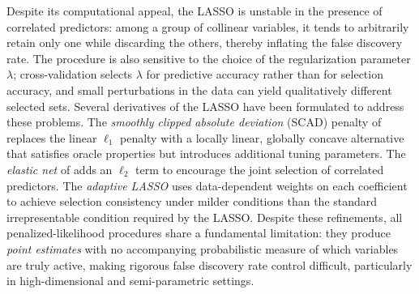 Despite its computational appeal, the LASSO is unstable in the
presence of correlated predictors: among a group of collinear
variables, it tends to arbitrarily retain only one while discarding
the others, thereby inflating the false discovery rate. The
procedure is also sensitive to the choice of the regularization
parameter $\lambda$; cross-validation selects $\lambda$ for
predictive accuracy rather than for selection accuracy, and small
perturbations in the data can yield qualitatively different selected
sets. Several derivatives of the LASSO have been formulated
to address these problems.  The \emph{smoothly clipped absolute deviation} (SCAD) penalty
of \citet{fan_variable_2001} replaces the linear $\ell_1$ penalty
with a locally linear, globally concave alternative that satisfies
oracle properties but introduces additional tuning parameters. The
\emph{elastic net} of \citet{zou_regularization_2005} adds an
$\ell_2$ term to encourage the joint selection of correlated
predictors. The \emph{adaptive LASSO} \citep{zou2006adaptive}
uses data-dependent weights on each coefficient to achieve
selection consistency under milder conditions than the standard
irrepresentable condition required by the LASSO. Despite these
refinements, all penalized-likelihood procedures share a fundamental
limitation: they produce \emph{point estimates} with no
accompanying probabilistic measure of which variables are truly
active, making rigorous false discovery rate control difficult,
particularly in high-dimensional and semi-parametric settings.



